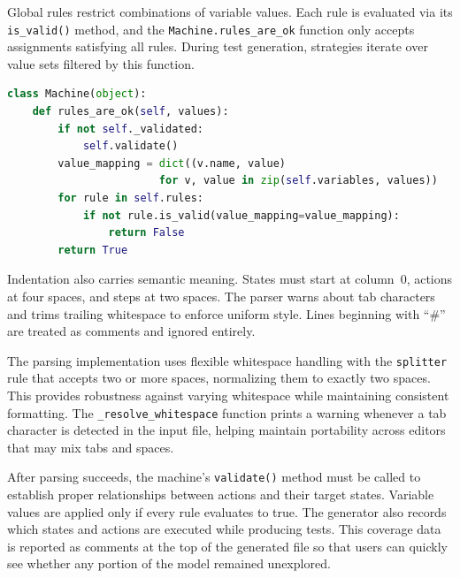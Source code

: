 Global rules restrict combinations of variable values. Each rule is evaluated via
its \texttt{is\_valid()} method, and the \texttt{Machine.rules\_are\_ok}
function only accepts assignments satisfying all rules. During test generation,
strategies iterate over value sets filtered by this function.

\begin{lstlisting}[language=python, caption={Rule evaluation pipeline.}, label={lst:rules_eval}]
class Machine(object):
    def rules_are_ok(self, values):
        if not self._validated:
            self.validate()
        value_mapping = dict((v.name, value) 
                        for v, value in zip(self.variables, values))
        for rule in self.rules:
            if not rule.is_valid(value_mapping=value_mapping):
                return False
        return True
\end{lstlisting}

\newpage

Indentation also carries semantic meaning. States must start at column~0,
actions at four spaces, and steps at two spaces. The parser warns about tab
characters and trims trailing whitespace to enforce uniform style. Lines
beginning with ``\#'' are treated as comments and ignored entirely.

The parsing implementation uses flexible whitespace handling with the
\texttt{splitter} rule that accepts two or more spaces, normalizing them to
exactly two spaces. This provides robustness against varying whitespace while
maintaining consistent formatting. The \texttt{\_resolve\_whitespace} function
prints a warning whenever a tab character is detected in the input file,
helping maintain portability across editors that may mix tabs and spaces.

After parsing succeeds, the machine's \texttt{validate()} method must be called
to establish proper relationships between actions and their target states. Variable
values are applied only if every rule evaluates to true. The generator also
records which states and actions are executed while producing tests. This
coverage data is reported as comments at the top of the generated file so that
users can quickly see whether any portion of the model remained unexplored.
